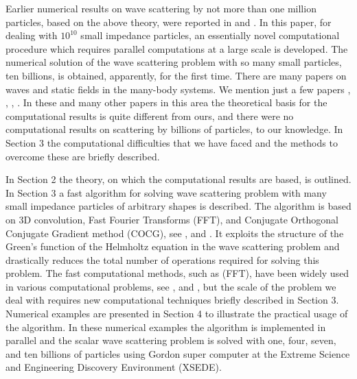 \documentclass{wap}
\begin{document}
Earlier numerical results on wave scattering by not more than one million particles, based on the above theory, were reported in \cite{Tran} and \cite{AR2011}. In this paper, for dealing with $10^{10}$ small impedance particles, an essentially novel computational procedure which requires parallel computations at a large scale is developed. The numerical solution of the wave scattering problem with so many small particles, ten billions, is obtained, apparently, for the first time. There are many papers on waves and static fields in the many-body systems. We mention just a few papers \cite{GR1987}, \cite{GR1997}, \cite{DardenYorkPedersen}, \cite{PhilWhite}. In these and many other papers in this area the theoretical basis for the computational results is quite different from ours, and there were no computational results on scattering by billions of particles, to our knowledge.  In Section 3 the computational difficulties that we have faced and the methods to overcome these are briefly described.

In  Section 2 the theory, on which the computational results are based, is outlined. In  Section 3 a fast algorithm for solving wave scattering problem with many small impedance particles of arbitrary shapes is described.
The algorithm is based on 3D convolution, Fast Fourier Transforms (FFT), and Conjugate Orthogonal Conjugate Gradient method (COCG), see \cite{COCG}, \cite{Clemens} and \cite{CG}. It exploits the structure of the Green's function of the Helmholtz equation in the wave scattering problem and drastically reduces the total number of operations required for solving this problem. The fast computational methods, such as (FFT), have been widely used in various computational
problems, see \cite{HE1988}, \cite{TDG2004} and \cite{BTK2001}, but the scale of the problem we deal with requires new computational  techniques briefly described in Section 3.
Numerical examples are presented in Section 4 to illustrate the practical usage of the algorithm. In these numerical examples the algorithm is implemented in parallel and the scalar wave scattering problem is solved with one, four, seven, and ten billions of particles using Gordon super computer at the Extreme Science and Engineering Discovery Environment (XSEDE).\vspace{0.6em}
\end{document}
